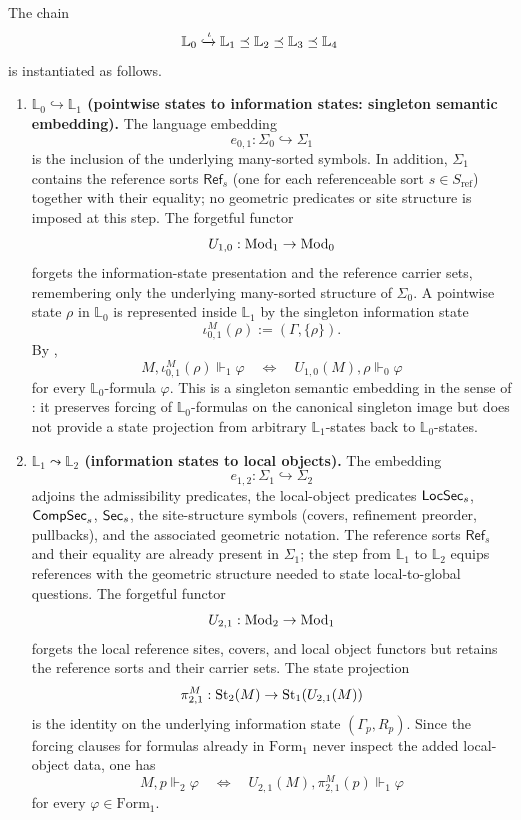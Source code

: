 \begin{proposition}\label{prop:chain-instantiation}
The chain
\[
\mathbb L_0\xhookrightarrow{\iota} \mathbb L_1\preceq \mathbb L_2\preceq \mathbb L_3\preceq \mathbb L_4
\]
is instantiated as follows.
\begin{enumerate}[label=(\roman*),leftmargin=3em]
\item \textbf{$\mathbb L_0\hookrightarrow\mathbb L_1$ (pointwise states to information states: singleton semantic embedding).}
The language embedding
\[
e_{0,1}:\Sigma_0\hookrightarrow \Sigma_1
\]
is the inclusion of the underlying many-sorted symbols. In addition, $\Sigma_1$ contains the reference sorts $\mathsf{Ref}_s$ (one for each referenceable sort $s\in S_{\mathrm{ref}}$) together with their equality; no geometric predicates or site structure is imposed at this step. The forgetful functor
\[
U_{1,0}:\mathrm{Mod}_1\to\mathrm{Mod}_0
\]
forgets the information-state presentation and the reference carrier sets, remembering only the underlying many-sorted structure of $\Sigma_0$. A pointwise state $\rho$ in $\mathbb L_0$ is represented inside $\mathbb L_1$ by the singleton information state
\[
\iota_{0,1}^M(\rho):=(\Gamma,\{\rho\}).
\]
By ,
\[
M,\iota_{0,1}^M(\rho)\Vdash_1\varphi
\quad\Longleftrightarrow\quad
U_{1,0}(M),\rho\Vdash_0\varphi
\]
for every $\mathbb L_0$-formula $\varphi$. This is a singleton semantic embedding in the sense of : it preserves forcing of $\mathbb L_0$-formulas on the canonical singleton image but does not provide a state projection from arbitrary $\mathbb L_1$-states back to $\mathbb L_0$-states.

\item \textbf{$\mathbb L_1\leadsto\mathbb L_2$ (information states to local objects).}
The embedding
\[
e_{1,2}:\Sigma_1\hookrightarrow \Sigma_2
\]
adjoins the admissibility predicates, the local-object predicates $\mathsf{LocSec}_s$, $\mathsf{CompSec}_s$, $\mathsf{Sec}_s$, the site-structure symbols (covers, refinement preorder, pullbacks), and the associated geometric notation. The reference sorts $\mathsf{Ref}_s$ and their equality are already present in $\Sigma_1$; the step from $\mathbb L_1$ to $\mathbb L_2$ equips references with the geometric structure needed to state local-to-global questions. The forgetful functor
\[
U_{2,1}:\mathrm{Mod}_2\to\mathrm{Mod}_1
\]
forgets the local reference sites, covers, and local object functors but retains the reference sorts and their carrier sets. The state projection
\[
\pi^M_{2,1}:\mathrm{St}_2(M)\to \mathrm{St}_1(U_{2,1}(M))
\]
is the identity on the underlying information state $(\Gamma_p,R_p)$. Since the forcing clauses for formulas already in $\mathrm{Form}_1$ never inspect the added local-object data, one has
\[
M,p\Vdash_2\varphi
\quad\Longleftrightarrow\quad
U_{2,1}(M),\pi^M_{2,1}(p)\Vdash_1\varphi
\]
for every $\varphi\in\mathrm{Form}_1$.


\end{enumerate}
\end{proposition}
